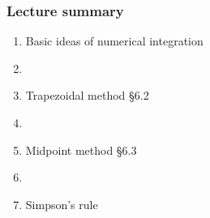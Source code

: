 \documentclass[english,14pt]{beamer}
\newcommand\red[1]{{\color{red} #1}}
\begin{document}
\begin{frame}[fragile]

\frametitle{Lecture summary}

\begin{enumerate}
	\item Basic ideas of numerical integration
	
	\item[]
	
	\item Trapezoidal method \red{\S6.2}
	
	\item[]
	
	\item Midpoint method \red{\S6.3}
	
	\item[]
	
	\item Simpson's rule
	
\end{enumerate}

\end{frame}

%
%
%
%	
%	
%	
%
\end{document}
